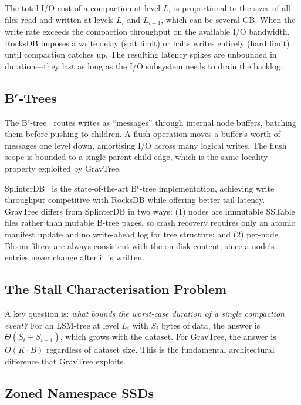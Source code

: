 \documentclass[10pt,twocolumn]{article}
\begin{document}
The total I/O cost of a compaction at level $L_i$ is proportional to the sizes
of all files read and written at levels $L_i$ and $L_{i+1}$, which can be
several GB.  When the write rate exceeds the compaction throughput on the
available I/O bandwidth, RocksDB imposes a write delay (soft limit) or
halts writes entirely (hard limit) until compaction catches up.  The
resulting latency spikes are unbounded in duration---they last as long as
the I/O subsystem needs to drain the backlog.

\subsection{\texorpdfstring{B$^\epsilon$-Trees}{B-epsilon Trees}}

The B$^\epsilon$-tree~\cite{bender2007cache} routes writes as
``messages'' through internal node buffers, batching them before pushing
to children.  A flush operation moves a buffer's worth of messages one
level down, amortising I/O across many logical writes.  The flush scope
is bounded to a single parent-child edge, which is the same locality
property exploited by GravTree.

SplinterDB~\cite{splinterdb} is the state-of-the-art B$^\epsilon$-tree
implementation, achieving write throughput competitive with RocksDB while
offering better tail latency.  GravTree differs from SplinterDB in two ways:
(1) nodes are immutable SSTable files rather than mutable B-tree pages, so
crash recovery requires only an atomic manifest update and no write-ahead log
for tree structure; and (2) per-node Bloom filters are always consistent with
the on-disk content, since a node's entries never change after it is written.

\subsection{The Stall Characterisation Problem}

A key question is: \textit{what bounds the worst-case duration of a single
compaction event?}  For an LSM-tree at level $L_i$ with $S_i$ bytes of data,
the answer is $\Theta(S_i + S_{i+1})$, which grows with the dataset.  For
GravTree, the answer is $O(K \cdot B)$ regardless of dataset size.  This
is the fundamental architectural difference that GravTree exploits.

\subsection{Zoned Namespace SSDs}
\end{document}
